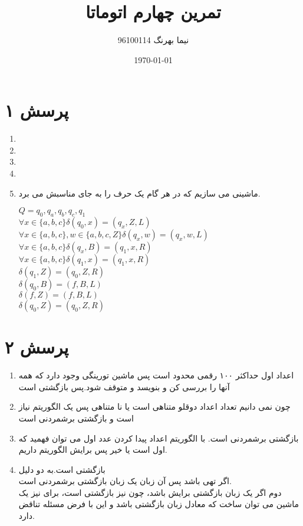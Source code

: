 \documentclass[a4paper]{article}
\title{تمرین چهارم اتوماتا}
\author{نیما بهرنگ 96100114}
\date{\today}
\begin{document}
\maketitle
{}


\section*{پرسش ۱}
\begin{enumerate}
\item{}
\item{}
\item{}
\item{}
\item{}
ماشینی می سازیم که در هر گام یک حرف را به جای مناسبش می برد.
\begin{latin}
$Q = {q_0, q_a, q_b, q_c, q_1}$\\

$\forall x \in \{a,b,c\} \delta(q_0,x)=(q_x,Z,L)$\\
$\forall x \in \{a,b,c\}, w \in \{a,b,c,Z\}  \delta(q_x,w) = (q_x,w,L)$\\
$\forall x \in \{a,b,c\} \delta(q_x,B)=(q_1,x,R)$\\
$\forall x \in \{a,b,c\} \delta(q_1,x)=(q_1,x,R)$\\
$\delta(q_1,Z) = (q_0,Z,R)$\\
$\delta(q_0,B) = (f,B,L)$\\
$\delta(f,Z) = (f,B,L)$\\
$\delta(q_0,Z) = (q_0,Z,R)$\\

\end{latin}
\end{enumerate}
\pagebreak
\section*{پرسش ۲}

\begin{enumerate}
\item{}
اعداد اول حداکثر ۱۰۰ رقمی محدود است پس ماشین تورینگی وجود دارد که همه آنها را بررسی کن و بنویسد و متوقف شود.پس بازگشتی است\\
\item{}
چون نمی دانیم تعداد اعداد دوقلو متناهی است یا نا متناهی پس یک الگوریتم نیاز است و بازگشتی برشمردنی است\\
\item{}
بازگشتی برشمردنی است. با الگوریتم اعداد پیدا کردن عدد اول می توان فهمید که اول است یا خیر پس برایش الگوریتم داریم.\\
\item{}
بازگشتی است.به دو دلیل\\
اگر 
تهی باشد پس آن زبان یک زبان بازگشتی برشمردنی است.\\
دوم اگر یک زبان بازگشتی برایش باشد، چون
نیز بازگشتی است، برای 
نیز یک ماشین می توان ساخت که معادل زبان بازگشتی باشد و این با فرض مسئله تناقض دارد.
\end{enumerate}
\end{document}
